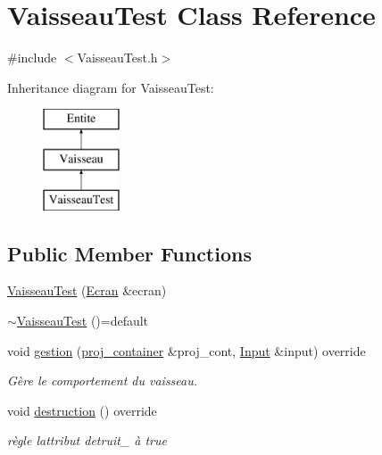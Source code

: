 \hypertarget{class_vaisseau_test}{}\section{Vaisseau\+Test Class Reference}
\label{class_vaisseau_test}


{\ttfamily \#include $<$Vaisseau\+Test.\+h$>$}

Inheritance diagram for Vaisseau\+Test\+:\begin{figure}[H]
\begin{center}
\leavevmode
\includegraphics[height=3.000000cm]{class_vaisseau_test}
\end{center}
\end{figure}
\subsection*{Public Member Functions}
\begin{DoxyCompactItemize}
\item 
\mbox{\hyperlink{class_vaisseau_test_ae8c0284c5cf04167922da1e026ea90d5}{Vaisseau\+Test}} (\mbox{\hyperlink{class_ecran}{Ecran}} \&ecran)
\item 
\mbox{\hyperlink{class_vaisseau_test_ac11bbc7f4f4b3b23cdac9724c56492c1}{$\sim$\+Vaisseau\+Test}} ()=default
\item 
void \mbox{\hyperlink{class_vaisseau_test_a9207fbb193d4395cefbd6977bc502bcb}{gestion}} (\mbox{\hyperlink{def__type_8h_a87980cd8ee9533e561a73e8bbc728188}{proj\+\_\+container}} \&proj\+\_\+cont, \mbox{\hyperlink{_input_8h_a5588d60d674991c719a8df848313e966}{Input}} \&input) override
\begin{DoxyCompactList}\small\item\em Gère le comportement du vaisseau. \end{DoxyCompactList}\item 
void \mbox{\hyperlink{class_vaisseau_test_a5cab0817183471868c5ed6392261f8ec}{destruction}} () override
\begin{DoxyCompactList}\small\item\em règle l\textquotesingle{}attribut detruit\+\_\+ à true \end{DoxyCompactList}\end{DoxyCompactItemize}

